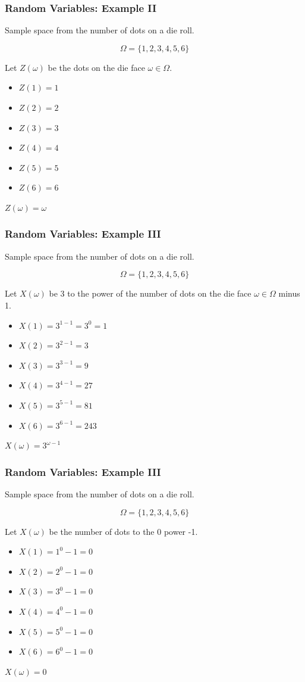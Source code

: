 \documentclass{beamer}
\numberwithin{equation}{section}
\begin{document}
\begin{frame}
\frametitle{Random Variables: Example II}
Sample space from the number of dots on a die roll.

$$\Omega=\{1,2,3,4,5,6\}$$

Let $Z(\omega)$ be the dots on the die face $\omega \in \Omega$.\pause

\begin{itemize}
\item $Z(1)=1$
\item $Z(2)=2$
\item $Z(3)= 3$
\item $Z(4)=4$
\item $Z(5)=5$
\item $Z(6)=6$
\end{itemize}
\pause
$Z(\omega)=\omega$
\end{frame}

\begin{frame}
\frametitle{Random Variables: Example III}
Sample space from the number of dots on a die roll.

$$\Omega=\{1,2,3,4,5,6\}$$

Let $X(\omega)$ be 3 to the power of the number of dots on the die face $\omega \in \Omega$ minus 1.\pause

\begin{itemize}
\item $X(1)=3^{1-1}$\pause$=3^0=1$\pause
\item $X(2)=3^{2-1} = 3$
\item $X(3)=3^{3-1} = 9$
\item $X(4)=3^{4-1} = 27$
\item $X(5)=3^{5-1} = 81$
\item $X(6)=3^{6-1} =  243$
\end{itemize}
\pause
$X(\omega)=3^{\omega-1}$
\end{frame}


\begin{frame}
\frametitle{Random Variables: Example III}
Sample space from the number of dots on a die roll.

$$\Omega=\{1,2,3,4,5,6\}$$

Let $X(\omega)$ be the number of dots to the 0 power -1.\pause

\begin{itemize}
\item $X(1)=1^0-1= 0$\pause
\item $X(2)=2^0-1 = 0$
\item $X(3)=3^0-1 = 0$
\item $X(4)=4^0-1 = 0$
\item $X(5)=5^0-1 =0$
\item $X(6)=6^0-1= 0$
\end{itemize}
\pause
$X(\omega)=0$
\end{frame}
\end{document}
